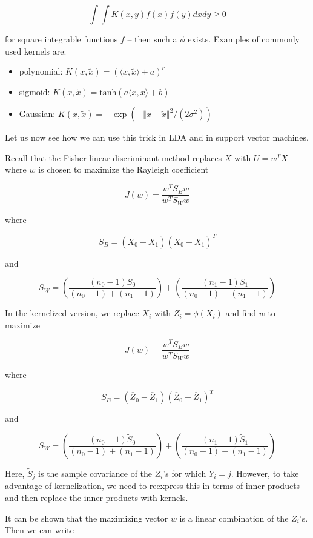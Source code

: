 \[ \int \int K(x, y) f(x) f(y) dx dy \geq 0 \]

for square integrable functions \(f\) -- then such a \(\phi\) exists.
Examples of commonly used kernels are:

\begin{itemize}[tightlist]
\item
  polynomial: \(K(x, \tilde{x}) = (\langle x, \tilde{x} \rangle + a)^r\)
\item
  sigmoid:
  \(K(x, \tilde{x}) = \text{tanh} (a \langle x, \tilde{x} \rangle + b)\)
\item
  Gaussian:
  \(K(x, \tilde{x}) = -\exp \left( - \Vert x - \tilde{x} \Vert^2 / (2 \sigma^2) \right)\)
\end{itemize}

Let us now see how we can use this trick in LDA and in support vector
machines.

Recall that the Fisher linear discriminant method replaces \(X\) with
\(U = w^T X\) where \(w\) is chosen to maximize the Rayleigh coefficient

\[ J(w) = \frac{w^T S_B w}{w^T S_W w} \]

where

\[ S_B = (\overline{X}_0 - \overline{X}_1)(\overline{X}_0 - \overline{X}_1)^T \]

and

\[ S_W = \left( \frac{(n_0 - 1) S_0}{(n_0 - 1) + (n_1 - 1)} \right) + \left( \frac{(n_1 - 1) S_1}{(n_0 - 1) + (n_1 - 1)} \right) \]

In the kernelized version, we replace \(X_i\) with \(Z_i = \phi(X_i)\)
and find \(w\) to maximize

\[ J(w) = \frac{w^T S_B w}{w^T S_W w} \]

where

\[ S_B = (\overline{Z}_0 - \overline{Z}_1)(\overline{Z}_0 - \overline{Z}_1)^T \]

and

\[ S_W = \left( \frac{(n_0 - 1) \tilde{S}_0}{(n_0 - 1) + (n_1 - 1)} \right) + \left( \frac{(n_1 - 1) \tilde{S}_1}{(n_0 - 1) + (n_1 - 1)} \right) \]

Here, \(\tilde{S}_j\) is the sample covariance of the \(Z_i\)'s for
which \(Y_i = j\). However, to take advantage of kernelization, we need
to reexpress this in terms of inner products and then replace the inner
products with kernels.

It can be shown that the maximizing vector \(w\) is a linear combination
of the \(Z_i\)'s. Then we can write

